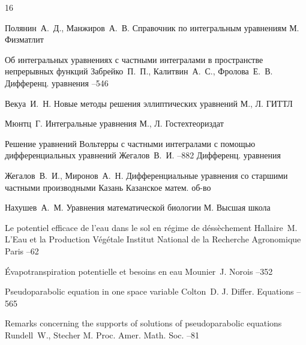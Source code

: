 \begin{thebibliography}{16}


\by Полянин~А.~Д., Манжиров~А.~В.
\book Справочник по интегральным уравнениям
\publaddr М.
\publ Физматлит

\paper Об интегральных уравнениях с частными интегралами в пространстве непрерывных функций
\by Забрейко~П.~П., Калитвин~А.~С., Фролова~Е.~В.
\jour Дифференц. уравнения
--546

\by Векуа~И.~Н.
\book Новые методы решения эллиптических уравнений
\publaddr М., Л.
\publ ГИТТЛ


\by Мюнтц~Г.
\book Интегральные уравнения 
\publaddr М., Л.
\publ Гостехтеориздат

\paper Решение уравнений Вольтерры с частными интегралами с помощью дифференциальных уравнений
\by Жегалов~В.~И.
–882
\jour Дифференц. уравнения

\by Жегалов~В.~И., Миронов~А.~Н.
\book Дифференциальные уравнения со старшими частными производными
\publaddr Казань
\publ Казанское матем. об-во

\by Нахушев~А.~М.
\book Уравнения математической биологии
\publaddr М.
\publ Высшая школа

\paper Le potentiel efficace de l'eau dans le sol en r\'egime de d\'ess\`echement   
\by Hallaire~M.
\inbook L'Eau et la Production V\'eg\'etale
\publ Institut National de la Recherche Agronomique
\publaddr Paris
--62

\paper  \'Evapotranspiration potentielle et besoins en eau 
\by Mounier~J.
\jour Norois
--352


\paper Pseudoparabolic equation in one space variable
\by Colton~D.
\jour J. Differ. Equations
--565

\paper Remarks concerning the supports of solutions of pseudoparabolic equations
\by Rundell~W., Stecher M.
\jour Proc. Amer. Math. Soc.
--81


\end{thebibliography}

